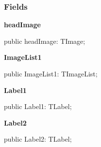\documentclass{report}
\newif\ifpdf
\begin{document}
\subsubsection*{\large{\textbf{Fields}}\normalsize\hspace{1ex}\hfill}
\begin{list}{}{
\setlength{\itemindent}{0cm}
\setlength{\listparindent}{0cm}
\setlength{\leftmargin}{\evensidemargin}
\addtolength{\leftmargin}{\tmplength}
\settowidth{\labelsep}{X}
\addtolength{\leftmargin}{\labelsep}
\setlength{\labelwidth}{\tmplength}
}
\label{thinstall.TisFrm-headImage}
\item[\textbf{headImage}\hfill]
\ifpdf
\begin{flushleft}
\fi
\begin{ttfamily}
public headImage: TImage;\end{ttfamily}

\ifpdf
\end{flushleft}
\fi


\par  \label{thinstall.TisFrm-ImageList1}
\item[\textbf{ImageList1}\hfill]
\ifpdf
\begin{flushleft}
\fi
\begin{ttfamily}
public ImageList1: TImageList;\end{ttfamily}

\ifpdf
\end{flushleft}
\fi


\par  \label{thinstall.TisFrm-Label1}
\item[\textbf{Label1}\hfill]
\ifpdf
\begin{flushleft}
\fi
\begin{ttfamily}
public Label1: TLabel;\end{ttfamily}

\ifpdf
\end{flushleft}
\fi


\par  \label{thinstall.TisFrm-Label2}
\item[\textbf{Label2}\hfill]
\ifpdf
\begin{flushleft}
\fi
\begin{ttfamily}
public Label2: TLabel;\end{ttfamily}

\ifpdf
\end{flushleft}
\fi



\end{list}
\end{document}
